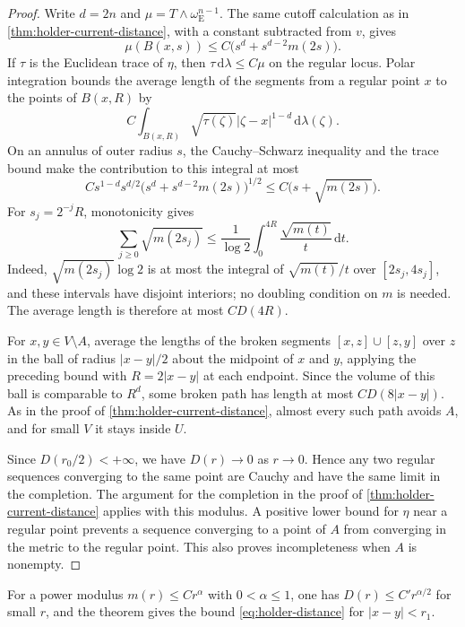\begin{proof}
Write $d=2n$ and $\mu=T\wedge\omega_{\mathrm E}^{n-1}$. The same cutoff calculation as in \cref{thm:holder-current-distance}, with a constant subtracted from $v$, gives
\[
 \mu(B(x,s))\leq C\bigl(s^d+s^{d-2}m(2s)\bigr).
\]
If $\tau$ is the Euclidean trace of $\eta$, then $\tau\,\mathrm{d}\lambda\leq C\mu$ on the regular locus. Polar integration bounds the average length of the segments from a regular point $x$ to the points of $B(x,R)$ by
\[
 C\int_{B(x,R)}\sqrt{\tau(\zeta)}
                      |\zeta-x|^{1-d}\,\mathrm{d}\lambda(\zeta).
\]
On an annulus of outer radius $s$, the Cauchy--Schwarz inequality and the trace bound make the contribution to this integral at most
\[
 Cs^{1-d}s^{d/2}
       \bigl(s^d+s^{d-2}m(2s)\bigr)^{1/2}
 \leq C\bigl(s+\sqrt{m(2s)}\bigr).
\]
For $s_j=2^{-j}R$, monotonicity gives
\[
 \sum_{j\geq0}\sqrt{m(2s_j)}
 \leq\frac1{\log2}\int_0^{4R}\frac{\sqrt{m(t)}}t\,\mathrm{d}t.
\]
Indeed, $\sqrt{m(2s_j)}\log2$ is at most the integral of $\sqrt{m(t)}/t$ over $[2s_j,4s_j]$, and these intervals have disjoint interiors; no doubling condition on $m$ is needed. The average length is therefore at most $CD(4R)$.

For $x,y\in V\setminus A$, average the lengths of the broken segments $[x,z]\cup[z,y]$ over $z$ in the ball of radius $|x-y|/2$ about the midpoint of $x$ and $y$, applying the preceding bound with $R=2|x-y|$ at each endpoint. Since the volume of this ball is comparable to $R^d$, some broken path has length at most $CD(8|x-y|)$. As in the proof of \cref{thm:holder-current-distance}, almost every such path avoids $A$, and for small $V$ it stays inside $U$.

Since $D(r_0/2)<+\infty$, we have $D(r)\to0$ as $r\to0$. Hence any two regular sequences converging to the same point are Cauchy and have the same limit in the completion. The argument for the completion in the proof of \cref{thm:holder-current-distance} applies with this modulus. A positive lower bound for $\eta$ near a regular point prevents a sequence converging to a point of $A$ from converging in the metric to the regular point. This also proves incompleteness when $A$ is nonempty.
\end{proof}

For a power modulus $m(r)\leq Cr^\alpha$ with $0<\alpha\leq1$, one has $D(r)\leq C'r^{\alpha/2}$ for small $r$, and the theorem gives the bound \eqref{eq:holder-distance} for $|x-y|<r_1$.

